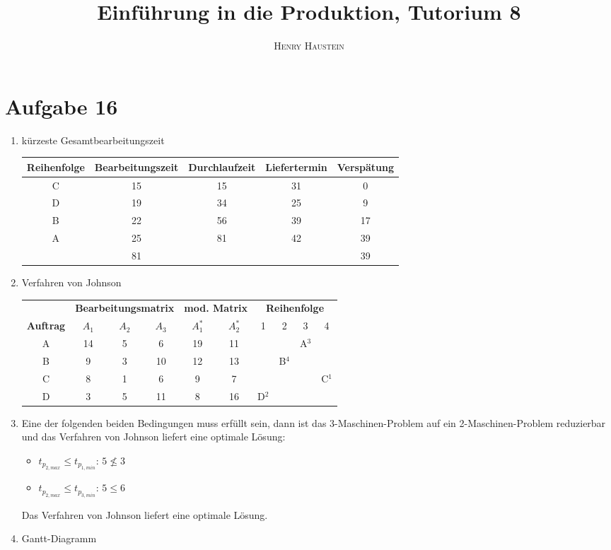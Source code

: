 \documentclass{article}
\title{\textbf{Einführung in die Produktion, Tutorium 8}}
\author{\textsc{Henry Haustein}}
\date{}
\begin{document}
	\maketitle
	
	\section*{Aufgabe 16}
	\begin{enumerate}[label=(\alph*)]
		\item kürzeste Gesamtbearbeitungszeit
		\begin{center}
			\begin{tabular}{c|c|c|c|c}
				\textbf{Reihenfolge} & \textbf{Bearbeitungszeit} & \textbf{Durchlaufzeit} & \textbf{Liefertermin} & \textbf{Verspätung} \\
				\hline
				C & 15 & 15 & 31 & 0 \\
				D & 19 & 34 & 25 & 9 \\
				B & 22 & 56 & 39 & 17 \\
				A & 25 & 81 & 42 & 39 \\
				\hline
				& 81 & & & 39
			\end{tabular}
		\end{center}
		\item Verfahren von Johnson
		\begin{center}
			\begin{tabular}{c|c|c|c||c|c||cccc}
				& \multicolumn{3}{c||}{\textbf{Bearbeitungsmatrix}} & \multicolumn{2}{c||}{\textbf{mod. Matrix}} & \multicolumn{4}{c}{\textbf{Reihenfolge}} \\
				\textbf{Auftrag} & $A_1$ & $A_2$ & $A_3$ & $A_1^\ast$ & $A_2^\ast$ & 1 & 2 & 3 & 4 \\
				\hline
				A & 14 & 5 & 6 & 19 & 11 & & & A$^3$ & \\
				B & 9 & 3 & 10 & 12 & 13 & & B$^4$ & & \\
				C & 8 & 1 & 6 & 9 & 7 & & & & C$^1$ \\
				D & 3 & 5 & 11 & 8 & 16 & D$^2$ & & &
			\end{tabular}
		\end{center}
		\item Eine der folgenden beiden Bedingungen muss erfüllt sein, dann ist das 3-Maschinen-Problem auf ein 2-Maschinen-Problem reduzierbar und das Verfahren von Johnson liefert eine optimale Lösung:
		\begin{itemize}
			\item $t_{p_{2,max}} \le t_{p_{1,min}}$: $5\not\le 3$
			\item $t_{p_{2,max}} \le t_{p_{3,min}}$: $5\le 6$
		\end{itemize}
		Das Verfahren von Johnson liefert eine optimale Lösung.
		\item Gantt-Diagramm
		\begin{center}
\end{center}
\end{enumerate}
\end{document}
